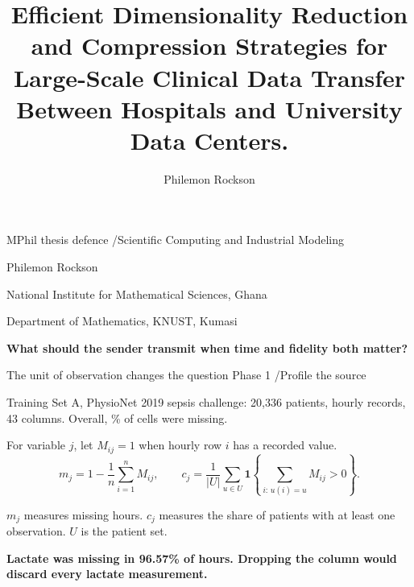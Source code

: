 \documentclass[aspectratio=169,11pt]{beamer}
\title{Efficient Dimensionality Reduction and Compression Strategies for Large-Scale Clinical Data Transfer Between Hospitals and University Data Centers.}
\author{Philemon Rockson}
\institute{Department of Mathematics, Kwame Nkrumah University of Science and Technology}
\date{}
\newcommand{\phase}[1]{{\small\color{forest}#1}\par\medskip}
\newcommand{\takeaway}[1]{\par\medskip{\color{gold}\rule{8mm}{1.6pt}}\enspace\textbf{#1}\par}
\begin{document}
\begin{frame}
\phase{MPhil thesis defence \enspace/\enspace Scientific Computing and Industrial Modeling}
{\LARGE\bfseries\color{forest}\inserttitle\par}
\medskip
{\large Philemon Rockson}\par
National Institute for Mathematical Sciences, Ghana\par
Department of Mathematics, KNUST, Kumasi
\takeaway{What should the sender transmit when time and fidelity both matter?}
\end{frame}

\begin{frame}{The unit of observation changes the question}
\phase{Phase 1 \enspace/\enspace Profile the source}
Training Set A, PhysioNet 2019 sepsis challenge: 20,336 patients, \studyRows{} hourly records, 43 columns. Overall, \studyMissing\% of cells were missing.
\begin{block}{For variable $j$, let $M_{ij}=1$ when hourly row $i$ has a recorded value.}
\[
 m_j=1-\frac{1}{n}\sum_{i=1}^{n}M_{ij},\qquad
 c_j=\frac{1}{|U|}\sum_{u\in U}\mathbf{1}\!\left\{\sum_{i:\,u(i)=u} M_{ij}>0\right\}.
\]
\end{block}
$m_j$ measures missing hours. $c_j$ measures the share of patients with at least one observation. $U$ is the patient set.
\takeaway{Lactate was missing in 96.57\% of hours. Dropping the column would discard every lactate measurement.}
\end{frame}
\end{document}
